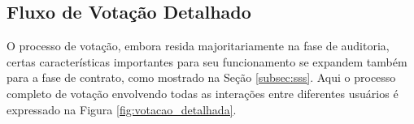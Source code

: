 







\subsection{Fluxo de Votação Detalhado}
\label{subsec:proposta:votacao_detalhada}

O processo de votação, embora resida majoritariamente na fase de auditoria, certas características importantes para seu funcionamento se expandem também para a fase de contrato, como mostrado na Seção \ref{subsec:sss}. Aqui o processo completo de votação envolvendo todas as interações entre diferentes usuários é expressado na Figura \ref{fig:votacao_detalhada}.

